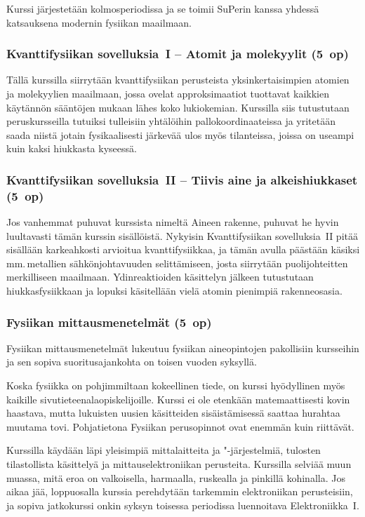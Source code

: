 \documentclass[../ala_hataile.tex]{subfiles}
\begin{document}
	Kurssi järjestetään kolmos\-periodissa ja se toimii SuPerin kanssa yhdessä katsauksena
	modernin fysiikan maailmaan.
	
	\subsubsection*{Kvanttifysiikan sovelluksia~I -- Atomit ja molekyylit (5~op)}
	Tällä kurssilla siirrytään kvanttifysiikan
	perusteista yksinkertaisimpien atomien ja
	molekyylien maailmaan, jossa ovelat approksimaatiot
	tuottavat kaikkien käytännön
	sääntöjen mukaan lähes koko lukio\-kemian.
	Kurssilla siis tutustutaan peruskursseilla
	tutuiksi tulleisiin yhtälöihin pall\-okoordinaateissa
	ja yritetään saada niistä jotain
	fysikaalisesti järkevää ulos myös tilanteissa,
	joissa on useampi kuin kaksi hiukkasta
	kyseessä.
	
	\subsubsection*{Kvanttifysiikan sovelluksia~II -- Tiivis aine ja alkeishiukkaset (5~op)}
	Jos vanhemmat puhuvat kurssista nimeltä
	Aineen rakenne, puhuvat he hyvin luultavasti
	tämän kurssin sisällöistä.
	Nykyisin Kvantti\-fysiikan sovelluksia~II pitää sisällään
	karkeahkosti arvioitua kvantti\-fysiikkaa, ja
	tämän avulla päästään käsiksi mm.\,metallien
	sähkönjohtavuuden selittämiseen, josta
	siirrytään puoli\-johteitten merkilliseen maailmaan.
	Ydinreaktioiden käsittelyn jälkeen
	tutustutaan hiukkas\-fysiikkaan ja lopuksi
	käsitellään vielä atomin pienimpiä rakenne\-osasia.
	
	\subsubsection*{Fysiikan mittausmenetelmät (5~op)}
	Fysiikan mittaus\-menetelmät lukeutuu
	fysiikan aine\-opintojen pakollisiin kursseihin
	ja sen sopiva suoritus\-ajan\-kohta on toisen
	vuoden syksyllä.
	
	Koska fysiikka on pohjimmiltaan kokeellinen
	tiede, on kurssi hyödyllinen myös
	kaikille sivu\-tieteen\-ala\-opiskelijoille.
	Kurssi ei ole etenkään
	matemaattisesti kovin haastava, mutta lukuisten
	uusien käsitteiden sisäistämisessä saattaa hurahtaa muutama tovi. Pohja\-tietona
	Fysiikan perus\-opinnot ovat enemmän
	kuin riittävät.
	
	Kurssilla käydään läpi yleisimpiä mitta\-laitteita
	ja "-järjestelmiä, tulosten tilastollista
	käsittelyä ja mittaus\-elektroniikan perusteita.
	Kurssilla selviää muun muassa, mitä
	eroa on valkoisella, harmaalla, ruskealla ja
	pinkillä kohinalla. Jos aikaa jää, loppuosalla
	kurssia perehdytään tarkemmin elektroniikan
	perusteisiin, ja sopiva jatkokurssi onkin
	syksyn toisessa periodissa luennoitava
	Elektroniikka~I.
	
\end{document}
